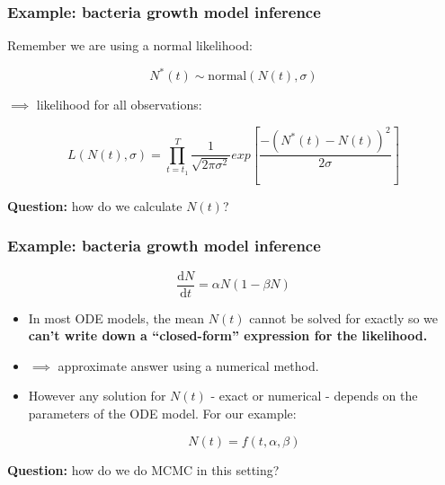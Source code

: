 \documentclass[handout]{beamer}
\begin{document}
\begin{frame}
	\frametitle{Example: bacteria growth model inference}
	 Remember we are using a normal likelihood:
	
	\begin{equation}
	N^*(t) \sim \text{normal}(N(t), \sigma)
	\end{equation}
	
	$\implies$ likelihood for all observations:
	
	\begin{equation}
	L(N(t),\sigma) = \prod_{t={t_1}}^{T} \frac{1}{\sqrt{2\pi\sigma^2}} exp\left[\frac{-(N^*(t) - N(t))^2}{2\sigma}\right]
	\end{equation}
	
	\textbf{Question:} how do we calculate $N(t)$?
	
\end{frame}

\begin{frame}
	\frametitle{Example: bacteria growth model inference}
	
	\begin{equation}
	\frac{\mathrm{d}N}{\mathrm{d}t} = \alpha N (1-\beta N)
	\end{equation}
	
	\begin{itemize}
		\item<2-> In most ODE models, the mean $N(t)$ cannot be solved for exactly so we \textbf{can't write down a ``closed-form'' expression for the likelihood.}
		\item<3-> $\implies$ approximate answer using a numerical method.
		\item<4-> However any solution for $N(t)$ - exact or numerical - depends on the parameters of the ODE model. For our example:
		
		
		\begin{equation}
		N(t) = f(t,\alpha,\beta)
		\end{equation}
		
	\end{itemize}
	
	\vspace{0.2cm}
	
	\textbf{Question:} how do we do MCMC in this setting?
	
\end{frame}
\end{document}
